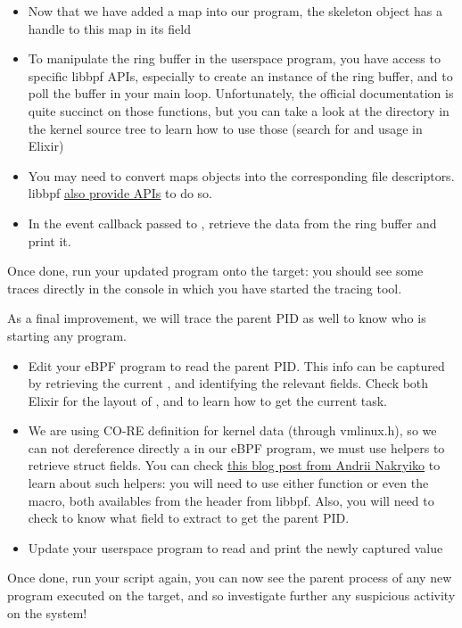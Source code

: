 \begin{itemize}
\begin{itemize}
    \item Now that we have added a map into our program, the skeleton object has a handle to this map in its  field
    \item To manipulate the ring buffer in the userspace program, you have
    access to specific libbpf APIs, especially  to
    create an instance of the ring buffer, and  to poll
    the buffer in your main loop. Unfortunately, the official documentation is
    quite succinct on those functions, but you can take a look at the
     directory in the kernel source tree to learn how to
    use those (search for  and
     usage in Elixir)
    \item You may need to convert maps objects into the corresponding file descriptors. libbpf \href{https://libbpf.readthedocs.io/en/latest/api.html}{also provide APIs} to do so.
    \item In the event callback passed to , retrieve the data from the ring buffer and print it.
  \end{itemize}
\end{itemize}

Once done, run your updated program onto the target: you should see some traces directly in the console in which you have started the tracing tool.

As a final improvement, we will trace the parent PID as well to know who is starting any program.
\begin{itemize}
  \item Edit your eBPF program to read the parent PID. This info can be captured by retrieving the current , and identifying the relevant fields. Check both Elixir for the layout of , and  to learn how to get the current task.
  \item We are using CO-RE definition for kernel data (through vmlinux.h), so
  we can not dereference directly a  in our eBPF
  program, we must use helpers to retrieve struct fields. You can check
  \href{https://nakryiko.com/posts/bpf-core-reference-guide/#the-missing-manual}{this
  blog post from Andrii Nakryiko} to learn about such helpers: you will need to
  use either  function or even the 
  macro, both availables from the  header from
  libbpf. Also, you will  need to check  to know what
  field to extract to get the parent PID.
  \item Update your userspace program to read and print the newly captured value
\end{itemize}

Once done, run your script again, you can now see the parent process of any new
program executed on the target, and so investigate further any suspicious
activity on the system!
